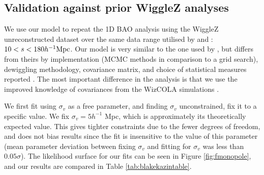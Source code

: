 \documentclass[iop,twocolappendix]{emulateapj}
\begin{document}
\subsection{Validation against prior WiggleZ analyses}


We use our model to repeat the 1D BAO analysis using the WiggleZ unreconstructed dataset over the same data range utilised by \citet{BlakeDavis2011} and \citet{BlakeKazin2011}: $10<s<180 h^{-1}\rm{Mpc}$. Our model is very similar to the one used by \citet{BlakeKazin2011}, but differs from theirs by implementation (MCMC methods in comparison to a grid search), dewiggling methodology, covariance matrix, and choice of statistical measures reported \citep[we use maximum likelihood statistics, as opposed to mean statistics used in][]{BlakeDavis2011}. The most important difference in the analysis is that we use the improved knowledge of covariances from the WizCOLA simulations \citep[as compared to the lognormal realisations used in][]{BlakeKazin2011}.

We first fit using $\sigma_v$ as a free parameter, and finding $\sigma_v$ unconstrained, fix it to a specific value. We fix $\sigma_v = 5 h^{-1}$ Mpc, which is approximately its theoretically expected value.  This gives tighter constraints due to the fewer degrees of freedom, and does not bias results since the fit is insensitive to the value of this parameter (mean parameter deviation between fixing $\sigma_v$ and fitting for $\sigma_v$ was less than $0.05\sigma$). The likelihood surface for our fits can be seen in Figure \ref{fig:fmonopole}, and our results are compared in Table \ref{tab:blakekazintable}. 
\end{document}
